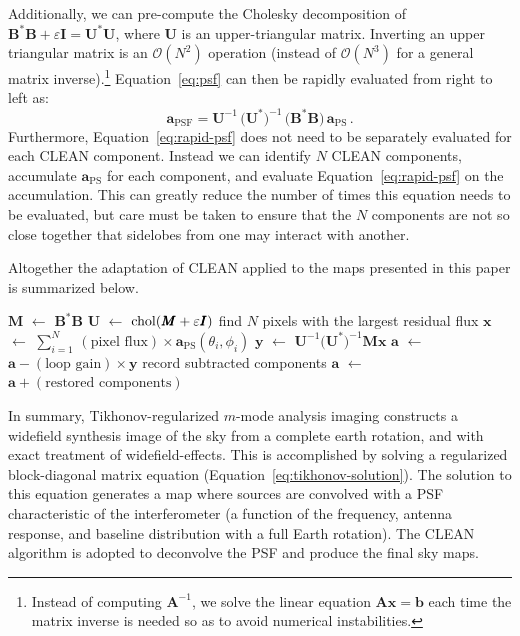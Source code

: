 \documentclass[twocolumn]{aastex61}
\newcommand*\Let[2]{\State #1 $\gets$ #2}
\renewcommand{\b}{\pmb}
\begin{document}
Additionally, we can pre-compute the Cholesky decomposition of $\b B^*\b B + \varepsilon\b I = \b
U^*\b U$, where $\b U$ is an upper-triangular matrix. Inverting an upper triangular matrix is an
$\mathcal{O}(N^2)$ operation (instead of $\mathcal{O}(N^3)$ for a general matrix inverse).\footnote{
    Instead of computing $\b A^{-1}$, we solve the linear equation $\b A\b x = \b b$ each time the
    matrix inverse is needed so as to avoid numerical instabilities.
}
Equation~\ref{eq:psf} can then be rapidly evaluated from right to left as:
\begin{equation}\label{eq:rapid-psf}
    \b a_\text{PSF} =
        \b U^{-1}\,\big(\b U^*\big)^{-1}\,\big(\b B^*\b B\big)\,\b a_\text{PS}\,.
\end{equation}
Furthermore, Equation~\ref{eq:rapid-psf} does not need to be separately evaluated for each CLEAN
component. Instead we can identify $N$ CLEAN components, accumulate $\b a_\text{PS}$ for each
component, and evaluate Equation~\ref{eq:rapid-psf} on the accumulation. This can greatly reduce the
number of times this equation needs to be evaluated, but care must be taken to ensure that the $N$
components are not so close together that sidelobes from one may interact with another.

Altogether the adaptation of CLEAN applied to the maps presented in this paper is summarized below.
\begin{algorithmic}[1]
    \Require{$\b a$ is the solution to Equation~\ref{eq:tikhonov-solution}}
    \Function{CLEAN}{$\b a$}
    \Let{$\b M$}{$\b B^*\b B$}
    \Let{$\b U$}{${\rm chol}(\b M + \varepsilon\b I)$} 
    \State find $N$ pixels with the largest residual flux
    \Let{$\b x$}{$\sum_{i=1}^N \,(\text{pixel flux}) \times \b a_\text{PS}(\theta_i, \phi_i)$}
    \Let{$\b y$}{$\b U^{-1}\big(\b U^*\big)^{-1}\b M\b x$}
    \Let{$\b a$}{$\b a - (\text{loop gain})\times\b y$}
    \State record subtracted components
    \EndWhile
    \Let{$\b a$}{$\b a + (\text{restored components})$}
    \State \Return{$\b a$}
    \EndFunction
\end{algorithmic}

In summary, Tikhonov-regularized $m$-mode analysis imaging constructs a widefield synthesis image of
the sky from a complete earth rotation, and  with exact treatment of widefield-effects. This is
accomplished by solving a regularized block-diagonal matrix equation
(Equation~\ref{eq:tikhonov-solution}). The solution to this equation generates a map where
sources are convolved with a PSF characteristic of the interferometer (a function of the frequency,
antenna response, and baseline distribution with a full Earth rotation). The CLEAN algorithm is
adopted to deconvolve the PSF and produce the final sky maps.
\end{document}
